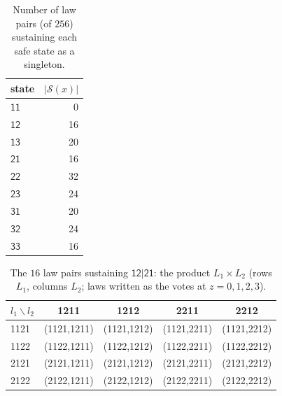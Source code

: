\documentclass[11pt,a4paper]{article}
\theoremstyle{plain}
\theoremstyle{definition}
\theoremstyle{remark}
\newcommand{\calS}{\mathcal{S}}
\newcommand{\st}[1]{\mathsf{#1}}
\begin{document}
\begin{table}[H]
\centering\small
\caption{Number of law pairs (of $256$) sustaining each safe state as a singleton.}
\label{tab:sustainers}
\begin{tabular}{lr}
\toprule
state & $|\calS(x)|$ \\
\midrule
$\st{11}$ & 0 \\
$\st{12}$ & 16 \\
$\st{13}$ & 20 \\
$\st{21}$ & 16 \\
$\st{22}$ & 32 \\
$\st{23}$ & 24 \\
$\st{31}$ & 20 \\
$\st{32}$ & 24 \\
$\st{33}$ & 16 \\
\bottomrule
\end{tabular}
\end{table}
\begin{table}[H]
\centering\small
\caption{The $16$ law pairs sustaining $\st{12|21}$: the product $L_1\times L_2$ (rows $L_1$, columns $L_2$; laws written as the votes at $z=0,1,2,3$).}
\label{tab:laws}
\begin{tabular}{lcccc}
\toprule
$l_1\backslash l_2$ & 1211 & 1212 & 2211 & 2212 \\
\midrule
1121 & (1121,1211) & (1121,1212) & (1121,2211) & (1121,2212) \\
1122 & (1122,1211) & (1122,1212) & (1122,2211) & (1122,2212) \\
2121 & (2121,1211) & (2121,1212) & (2121,2211) & (2121,2212) \\
2122 & (2122,1211) & (2122,1212) & (2122,2211) & (2122,2212) \\
\bottomrule
\end{tabular}
\end{table}
\end{document}

